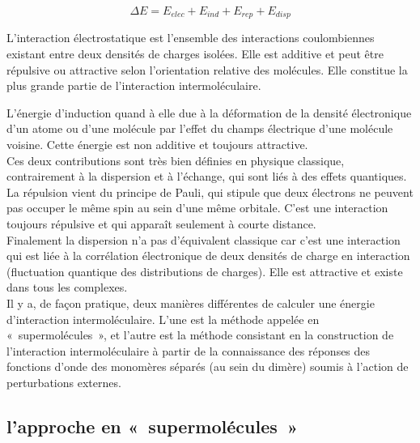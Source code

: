 \begin{equation}
\Delta E = E_{elec} + E_{ind} + E_{rep} + E_{disp}
\end{equation} 

L’interaction électrostatique est l’ensemble des interactions coulombiennes existant entre deux densités de charges isolées. Elle est additive et peut être répulsive ou attractive selon l’orientation relative des molécules. Elle constitue la plus grande partie de l’interaction intermoléculaire. 
 
L’énergie d’induction quand à elle due à la déformation de la densité électronique d’un atome ou d’une molécule par l’effet du champs électrique d’une molécule voisine. Cette énergie est non additive et toujours attractive.\\

Ces deux contributions sont très bien définies en physique classique, contrairement à la dispersion et à l’échange, qui sont liés à des effets quantiques.\\

La répulsion vient du principe de Pauli, qui stipule que deux électrons ne peuvent pas occuper le même spin au sein d’une même orbitale. C’est une interaction toujours répulsive et qui apparaît seulement à courte distance.\\

Finalement la dispersion n’a pas d’équivalent classique car c’est une interaction qui est liée à la corrélation électronique de deux densités de charge en interaction (fluctuation quantique des distributions de charges). Elle est attractive et existe dans tous les complexes.\\

Il y a, de façon pratique, deux manières différentes de calculer une énergie d’interaction intermoléculaire. L’une est la méthode appelée en « supermolécules », et l’autre est la méthode consistant en la construction de l’interaction intermoléculaire à partir de la connaissance des réponses des fonctions d’onde des monomères séparés (au sein du dimère) soumis à l’action de perturbations externes.\\

\subsection{l’approche en « supermolécules »}

